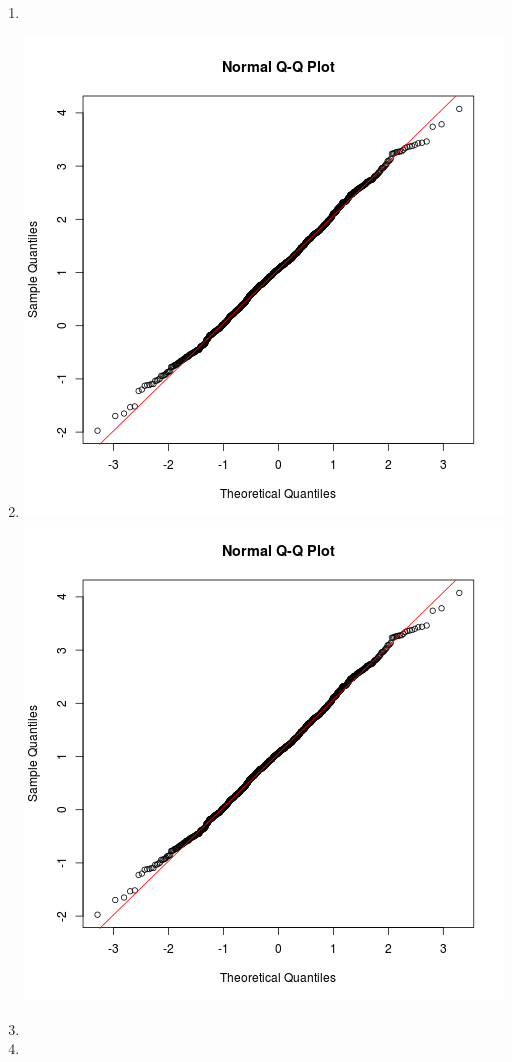 \documentclass{homework}
\begin{document}
\begin{enumerate}
\begin{enumerate}
\item 
\item
\includegraphics[scale=0.3]{../data/albi_ueb10_a38_qqnorm.png}
\includegraphics[scale=0.3]{../data/albi_ueb10_a38_qqnorm.png}
\item
\item
\end{enumerate}

\end{enumerate}
\end{document}
